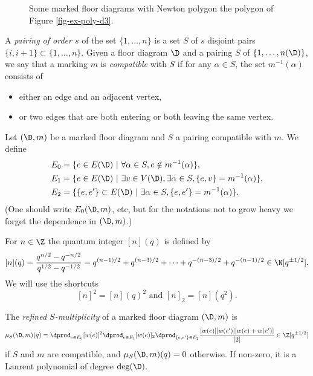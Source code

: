 \begin{exam}
\begin{figure}[ht]
\begin{subfigure}[t]{0.33\textwidth}
	\caption{}
	\label{fig-exdiagmarkc}
\end{subfigure}
	\caption{Some marked floor diagrams with Newton polygon the polygon of Figure \ref{fig-ex-poly-d3}.}
	\label{fig-exdiagmark}
\end{figure}
\end{exam}


 A \emph{pairing of order $s$} of the set $\{1,\dots,n\}$ is a set $S$ of $s$ disjoint pairs $\{i,i+1\} \subset \{1,\dots,n\}$. 
 Given a floor diagram $\D$ and a pairing $S$ of $\{1,\dots,n(\D)\}$, we say that a marking $m$ is \emph{compatible} with $S$ if for any $\alpha \in S$, the set $m^{-1}(\alpha)$ consists of
 \begin{itemize}
 	\item either an edge and an adjacent vertex,
 	\item or two edges that are both entering or both leaving the same vertex.
 \end{itemize}
Let $(\D,m)$ be a marked floor diagram and $S$ a pairing compatible with $m$. We define
\begin{align*}
E_0 &= \{e \in E(\D)\ |\ \forall \alpha\in S, e \notin m^{-1}(\alpha) \}, \\
E_1 &= \{e \in E(\D)\ |\ \exists v\in V(\D), \exists \alpha\in S, \{e,v\} = m^{-1}(\alpha) \} , \\
E_2 &= \{\{e,e'\} \subset E(\D)\ |\ \exists \alpha\in S, \{e,e'\} = m^{-1}(\alpha) \}. 
\end{align*}
(One should write $E_0(\D,m)$, etc, but for the notations not to grow heavy we forget the dependence in $(\D,m)$.)


For $n\in\Z$ the quantum integer $[n](q)$ is defined by
\[ [n](q) = \dfrac{q^{n/2}-q^{-n/2}}{q^{1/2}-q^{-1/2}} = q^{(n-1)/2} + q^{(n-3)/2} + \cdots + q^{-(n-3)/2} + q^{-(n-1)/2} \in \N[q^{\pm 1/2}] . \]
We will use the shortcuts
\[ [n]^2 = [n](q)^2 \text{ and } [n]_2 = [n](q^2).  \]

\begin{defi} \label{def-mult-GS}
The \emph{refined $S$-multiplicity} of a marked floor diagram $(\D,m)$ is
\[ \mu_S(\D,m)(q) = \dprod_{e\in E_0} [w(e)]^2 \dprod_{e\in E_1} [w(e)]_2 \dprod_{\{e,e'\} \in E_2} \dfrac{[w(e)][w(e')][w(e)+w(e')]}{[2]} \in \Z[q^{\pm 1/2}] \]
if $S$ and $m$ are compatible, and $\mu_S(\D,m)(q)=0$ otherwise. If non-zero, it is a Laurent polynomial of degree $\deg(\D)$.
\end{defi}

